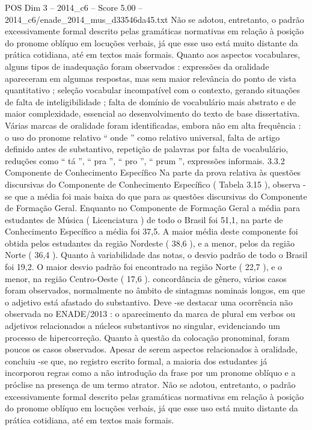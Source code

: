 \begin{textsample}{POS Dim 3 – 2014\_c6 – Score 5.00 – 2014\_c6/enade\_2014\_mus\_d33546da45.txt}
Não se adotou, entretanto, o padrão excessivamente formal descrito pelas gramáticas normativas em relação à posição do pronome oblíquo em locuções verbais, já que esse uso está muito distante da prática cotidiana, até em textos mais formais.
Quanto aos aspectos vocabulares, alguns tipos de inadequação foram observados : expressões da oralidade apareceram em algumas respostas, mas sem maior relevância do ponto de vista quantitativo ; seleção vocabular incompatível com o contexto, gerando situações de falta de inteligibilidade ; falta de domínio de vocabulário mais abstrato e de maior complexidade, essencial ao desenvolvimento do texto de base dissertativa.
Várias marcas de oralidade foram identificadas, embora não em alta frequência : o uso do pronome relativo “ onde ” como relativo universal, falta de artigo definido antes de substantivo, repetição de palavras por falta de vocabulário, reduções como “ tá ”, “ pra ”, “ pro ”, “ prum ”, expressões informais. 3.3.2 Componente de Conhecimento Específico Na parte da prova relativa às questões discursivas do Componente de Conhecimento Específico ( Tabela 3.15 ), observa -se que a média foi mais baixa do que para as questões discursivas do Componente de Formação Geral.
Enquanto no Componente de Formação Geral a média para estudantes de Música ( Licenciatura ) de todo o Brasil foi 51,1, na parte de Conhecimento Específico a média foi 37,5.
A maior média deste componente foi obtida pelos estudantes da região Nordeste ( 38,6 ), e a menor, pelos da região Norte ( 36,4 ).
Quanto à variabilidade das notas, o desvio padrão de todo o Brasil foi 19,2.
O maior desvio padrão foi encontrado na região Norte ( 22,7 ), e o menor, na região Centro-Oeste ( 17,6 ). concordância de gênero, vários casos foram observados, normalmente no âmbito de sintagmas nominais longos, em que o adjetivo está afastado do substantivo.
Deve -se destacar uma ocorrência não observada no ENADE/2013 : o aparecimento da marca de plural em verbos ou adjetivos relacionados a núcleos substantivos no singular, evidenciando um processo de hipercorreção.
Quanto à questão da colocação pronominal, foram poucos os casos observados.
Apesar de serem aspectos relacionados à oralidade, concluiu -se que, no registro escrito formal, a maioria dos estudantes já incorporou regras como a não introdução da frase por um pronome oblíquo e a próclise na presença de um termo atrator.
Não se adotou, entretanto, o padrão excessivamente formal descrito pelas gramáticas normativas em relação à posição do pronome oblíquo em locuções verbais, já que esse uso está muito distante da prática cotidiana, até em textos mais formais.

\end{textsample}
